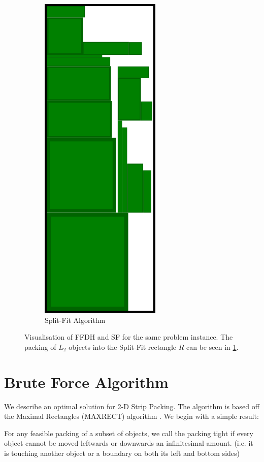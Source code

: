 \documentclass{article}
\begin{document}
\begin{figure}[ht]
\begin{subfigure}[b]{.35\textwidth}
  \includegraphics[width=.5\linewidth]{SplitFitrun.png}
  \caption{Split-Fit Algorithm}
  \label{fig:splitfitrun}
\end{subfigure}
  \caption{Visualisation of FFDH and SF for the same problem instance. The packing of $L_2$ objects into the Split-Fit rectangle $R$ can be seen in \ref{fig:splitfitrun}.}
  \label{fig:ffdhsfrun}
\end{figure}


\section{Brute Force Algorithm}
We describe an optimal solution for 2-D Strip Packing. The algorithm is based off the Maximal Rectangles (MAXRECT) algorithm \cite{maxrects}. We begin with a simple result:

\begin{defn}
For any feasible packing of a subset of objects, we call the packing tight if every object cannot be moved leftwards or downwards an infinitesimal amount. (i.e. it is touching another object or a boundary on both its left and bottom sides)
\end{defn}
\end{document}
